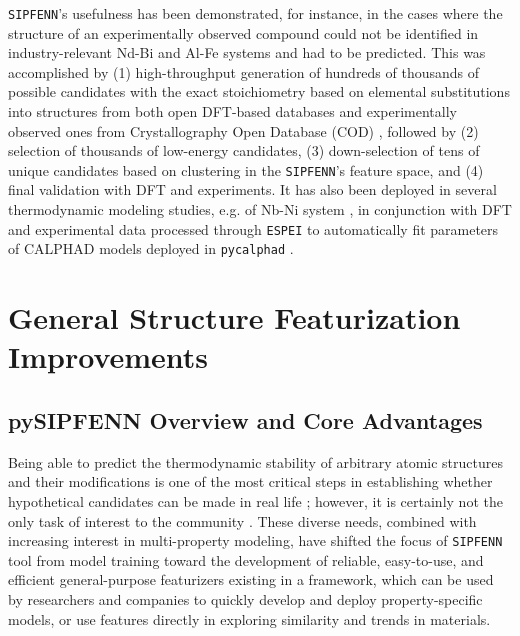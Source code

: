 \texttt{SIPFENN}'s usefulness has been demonstrated, for instance, in the cases where the structure of an experimentally observed compound could not be identified in industry-relevant Nd-Bi \cite{Im2022ThermodynamicModeling} and Al-Fe \cite{Shang2021FormingJoints} systems and had to be predicted. This was accomplished by (1) high-throughput generation of hundreds of thousands of possible candidates with the exact stoichiometry based on elemental substitutions into structures from both open DFT-based databases \cite{Saal2013MaterialsOQMD, Kirklin2015TheEnergies, Shen2022ReflectionsOQMD, Curtarolo2013AFLOW:Discovery, Toher2018TheDiscovery, Jain2013Commentary:Innovation, Choudhary2020TheDesign, Schmidt2022AFunctionals, Merchant2023ScalingDiscovery} and experimentally observed ones from Crystallography Open Database (COD) \cite{Grazulis2009CrystallographyStructures, Grazulis2012CrystallographyCollaboration, Grazulis2019CrystallographyPerspectives}, followed by (2) selection of thousands of low-energy candidates, (3) down-selection of tens of unique candidates based on clustering in the \texttt{SIPFENN}'s feature space, and (4) final validation with DFT and experiments. It has also been deployed in several thermodynamic modeling studies, e.g. of Nb-Ni system \cite{Sun2023ThermodynamicESPEI}, in conjunction with DFT and experimental data processed through \texttt{ESPEI} \cite{Bocklund2019ESPEICuMg} to automatically fit parameters of CALPHAD \cite{Olson2023GenomicDynamics} models deployed in \texttt{pycalphad} \cite{Otis2017Pycalphad:Python}.


\section{General Structure Featurization Improvements} \label{sec:featurization}

\subsection{pySIPFENN Overview and Core Advantages} \label{ssec:coreimprovements}

Being able to predict the thermodynamic stability of arbitrary atomic structures and their modifications is one of the most critical steps in establishing whether hypothetical candidates can be made in real life \cite{Zunger2019BewareMaterials}; however, it is certainly not the only task of interest to the community \cite{Jha2023MachineChallenges, Tao2021MachineDiscovery}. These diverse needs, combined with increasing interest in multi-property modeling, have shifted the focus of \texttt{SIPFENN} tool from model training \cite{Krajewski2022ExtensibleNetworks} toward the development of reliable, easy-to-use, and efficient general-purpose featurizers existing in a framework, which can be used by researchers and companies to quickly develop and deploy property-specific models, or use features directly in exploring similarity and trends in materials.

